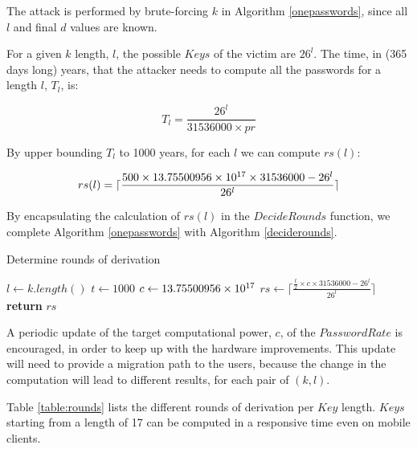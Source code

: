 \documentclass{sig-alternate}
\begin{document}
The attack is performed by brute-forcing $k$ in Algorithm \ref{onepasswords}, since all
$l$ and final $d$ values are known.

For a given $k$ length, $l$, the possible $Keys$ of the victim are $26^{l}$.
The time, in (365 days long) years, that the attacker needs to compute all the
passwords for a length $l$, $T_{l}$, is:

$$ \textit{$T_{l}$} = \frac{26^{l}}{31536000 \times \textit{pr}}$$

By upper bounding $T_{l}$ to 1000 years, for each $l$ we can compute $rs(l)$:

$$rs(l) = \lceil \frac{500 \times 13.75500956 \times 10^{17} \times 31536000 - 26^{l} }{26^{l}} \rceil $$

By encapsulating the calculation of $rs(l)$ in the $DecideRounds$ function, we complete
Algorithm \ref{onepasswords} with Algorithm \ref{deciderounds}.

\begin{algorithm}[H]
  \caption{Determine rounds of derivation}
  \label{deciderounds}
  \begin{algorithmic}[1]
    \State $l\gets k.length()$
    \State $t\gets 1000$
    \State $c\gets 13.75500956 \times 10^{17}$
    \State $rs\gets \lceil \frac{\frac{t}{2} \times c \times 31536000 - 26^{l} }{26^{l}} \rceil$
    \State \textbf{return} $rs$
    \EndProcedure
    \end{algorithmic}
\end{algorithm}

A periodic update of the target computational power, $c$, of the $Password Rate$
is encouraged, in order to keep up with the hardware improvements. This update
will need to provide a migration path to the users, because the change in the
computation will lead to different results, for each pair of $(k, l)$.

Table \ref{table:rounds} lists the different rounds of derivation per $Key$ length.
$Keys$ starting from a length of 17 can be computed in a responsive time even on mobile clients.
\end{document}
